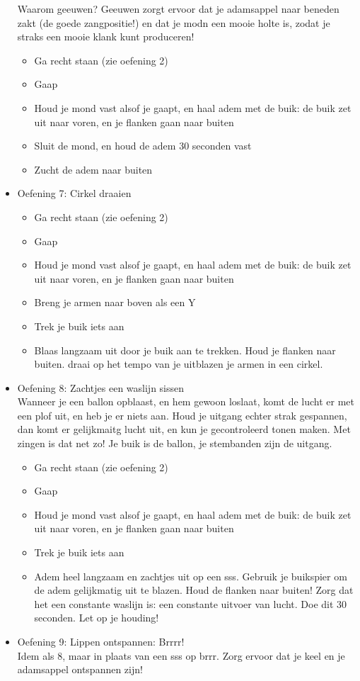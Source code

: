 \begin{itemize}
Waarom geeuwen? Geeuwen zorgt ervoor dat je adamsappel naar beneden zakt (de goede zangpositie!) en dat je modn een mooie holte is, zodat je straks een mooie klank kunt produceren!
\begin{itemize} 
\item Ga recht staan (zie oefening 2)
\item Gaap
\item Houd je mond vast alsof je gaapt, en haal adem met de buik: de buik zet uit naar voren, en je flanken gaan naar buiten
\item Sluit de mond, en houd de adem 30 seconden vast
\item Zucht de adem naar buiten
\end{itemize}
\item Oefening 7: Cirkel draaien
\begin{itemize} 
\item Ga recht staan (zie oefening 2)
\item Gaap
\item Houd je mond vast alsof je gaapt, en haal adem met de buik: de buik zet uit naar voren, en je flanken gaan naar buiten
\item Breng je armen naar boven als een Y
\item Trek je buik iets aan
\item Blaas langzaam uit door je buik aan te trekken. Houd je flanken naar buiten. draai op het tempo van je uitblazen je armen in een cirkel.
\end{itemize}
\item Oefening 8: Zachtjes een waslijn sissen \\
Wanneer je een ballon opblaast, en hem gewoon loslaat, komt de lucht er met een plof uit, en heb je er niets aan. Houd je uitgang echter strak gespannen, dan komt er gelijkmaitg lucht uit, en kun je gecontroleerd tonen maken. Met zingen is dat net zo! Je buik is de ballon, je stembanden zijn de uitgang.
\begin{itemize} 
\item Ga recht staan (zie oefening 2)
\item Gaap
\item Houd je mond vast alsof je gaapt, en haal adem met de buik: de buik zet uit naar voren, en je flanken gaan naar buiten
\item Trek je buik iets aan
\item Adem heel langzaam en zachtjes uit op een sss. Gebruik je buikspier om de adem gelijkmatig uit te blazen. Houd de flanken naar buiten! Zorg dat het een constante waslijn is: een constante uitvoer van lucht. Doe dit 30 seconden. Let op je houding!
\end{itemize}
\item Oefening 9: Lippen ontspannen: Brrrr! \\
Idem als 8, maar in plaats van een sss op brrr. Zorg ervoor dat je keel en je adamsappel ontspannen zijn!
\end{itemize}



